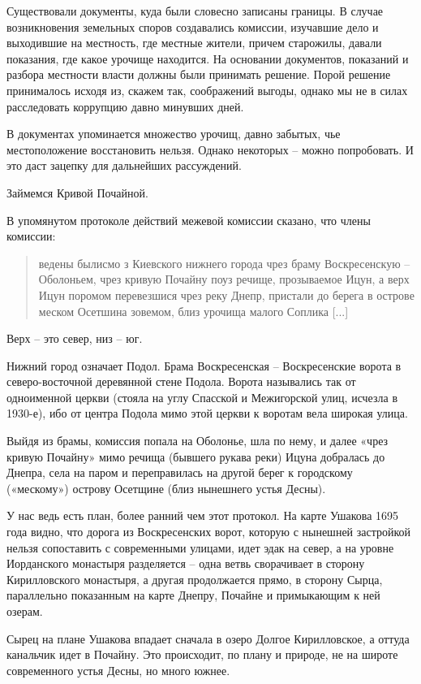 Существовали документы, куда были словесно записаны границы. В случае возникновения земельных споров создавались комиссии, изучавшие дело и выходившие на местность, где местные жители, причем старожилы, давали показания, где какое урочище находится. На основании документов, показаний и разбора местности власти должны были принимать решение. Порой решение принималось исходя из, скажем так, соображений выгоды, однако мы не в силах расследовать коррупцию давно минувших дней.

В документах упоминается множество урочищ, давно забытых, чье местоположение восстановить нельзя. Однако некоторых – можно попробовать. И это даст зацепку для дальнейших рассуждений.

Займемся Кривой Почайной.

В упомянутом протоколе действий межевой комиссии сказано, что члены комиссии:

\begin{quotation}
ведены былисмо з Киевского нижнего города чрез браму Воскресенскую – Оболоньем, чрез кривую Почайну поуз речище, прозываемое Ицун, а верх Ицун поромом перевезшися чрез реку Днепр, пристали до берега в острове меском Осетшина зовемом, близ урочища малого Соплика [...]
\end{quotation}

Верх – это север, низ – юг.

Нижний город означает Подол. Брама Воскресенская – Воскресенские ворота в северо-восточной деревянной стене Подола. Ворота назывались так от одноименной церкви (стояла на углу Спасской и Межигорской улиц, исчезла в 1930-е), ибо от центра Подола мимо этой церкви к воротам вела широкая улица.

Выйдя из брамы, комиссия попала на Оболонье, шла по нему, и далее «чрез кривую Почайну»   мимо речища (бывшего рукава реки) Ицуна добралась до Днепра, села на паром и переправилась на другой берег к городскому («мескому») острову Осетщине (близ нынешнего устья Десны).

У нас ведь есть план, более ранний чем этот протокол. На карте Ушакова 1695 года видно, что дорога из Воскресенских ворот, которую с нынешней застройкой нельзя сопоставить с современными улицами, идет эдак на север, а на уровне Иорданского монастыря разделяется – одна ветвь сворачивает в сторону Кирилловского монастыря, а другая продолжается прямо, в сторону Сырца, параллельно показанным на карте Днепру, Почайне и примыкающим к ней озерам.

Сырец на плане Ушакова впадает сначала в озеро Долгое Кирилловское, а оттуда канальчик идет в Почайну. Это происходит, по плану и природе, не на широте современного устья Десны, но много южнее.

